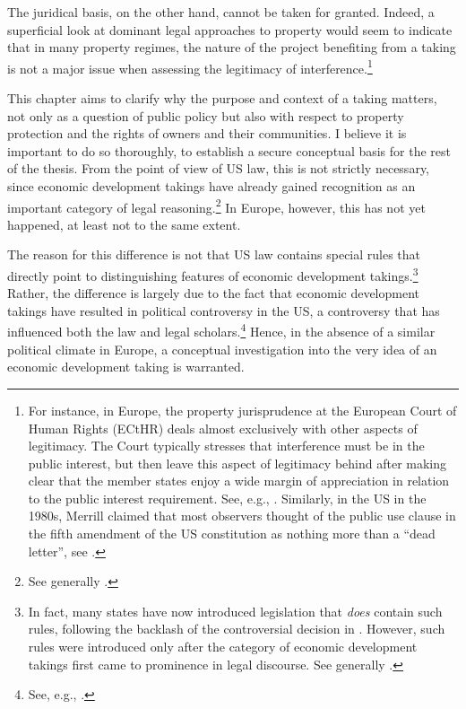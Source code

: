 The juridical basis, on the other hand, cannot be taken for granted. Indeed, a superficial look at dominant legal approaches to property would seem to indicate that in many property regimes, the nature of the project benefiting from a taking is not a major issue when assessing the legitimacy of interference.\footnote{For instance, in Europe, the property jurisprudence at the European Court of Human Rights (ECtHR) deals almost exclusively with other aspects of legitimacy. The Court typically stresses that interference must be in the public interest, but then leave this aspect of legitimacy behind after making clear that the member states enjoy a wide margin of appreciation in relation to the public interest requirement. See, e.g., \cite{james86,lindheim12}. Similarly, in the US in the 1980s, Merrill claimed that most observers thought of the public use clause in the fifth amendment of the US constitution as nothing more than a ``dead letter'', see \cite[61]{merrill86}.} 

This chapter aims to clarify why the purpose and context of a taking matters, not only as a question of public policy but also with respect to property protection and the rights of owners and their communities. I believe it is important to do so thoroughly, to establish a secure conceptual basis for the rest of the thesis. From the point of view of US law, this is not strictly necessary, since economic development takings have already gained recognition as an important category of legal reasoning.\footnote{See generally \cite{cohen06,somin07,malloy08}.} In Europe, however, this has not yet happened, at least not to the same extent.

The reason for this difference is not that US law contains special rules that directly point to distinguishing features of economic development takings.\footnote{In fact, many states have now introduced legislation that {\it does} contain such rules, following the backlash of the controversial decision in \cite{kelo05}. However, such rules were introduced only after the category of economic development takings first came to prominence in legal discourse. See generally \cite{eagle08,somin09,jacobs11}.} Rather, the difference is largely due to the fact that economic development takings have resulted in political controversy in the US, a controversy that has influenced both the law and legal scholars.\footnote{See, e.g., \cite[1190-1192]{somin08}.} Hence, in the absence of a similar political climate in Europe, a conceptual investigation into the very idea of an economic development taking is warranted.


